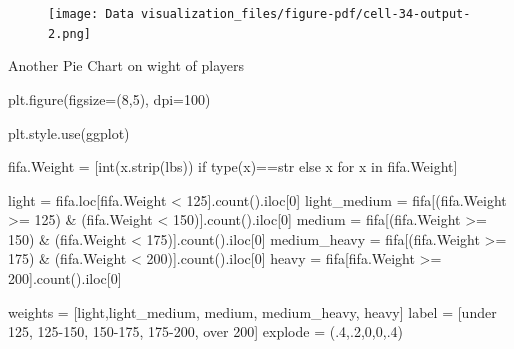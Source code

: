 \documentclass[
  letterpaper,
  DIV=11,
  numbers=noendperiod]{scrreprt}
\newenvironment{Shaded}{\begin{snugshade}}{\end{snugshade}}
\newcommand{\BuiltInTok}[1]{\textcolor[rgb]{0.00,0.23,0.31}{#1}}
\newcommand{\ControlFlowTok}[1]{\textcolor[rgb]{0.00,0.23,0.31}{#1}}
\newcommand{\DecValTok}[1]{\textcolor[rgb]{0.68,0.00,0.00}{#1}}
\newcommand{\FloatTok}[1]{\textcolor[rgb]{0.68,0.00,0.00}{#1}}
\newcommand{\KeywordTok}[1]{\textcolor[rgb]{0.00,0.23,0.31}{#1}}
\newcommand{\NormalTok}[1]{\textcolor[rgb]{0.00,0.23,0.31}{#1}}
\newcommand{\OperatorTok}[1]{\textcolor[rgb]{0.37,0.37,0.37}{#1}}
\newcommand{\StringTok}[1]{\textcolor[rgb]{0.13,0.47,0.30}{#1}}
\begin{document}
\begin{figure}[H]

{\centering \texttt{[image: Data visualization\_files/figure-pdf/cell-34-output-2.png]}

}

\end{figure}

Another Pie Chart on wight of players

\begin{Shaded}
\begin{Highlighting}[]
\NormalTok{plt.figure(figsize}\OperatorTok{=}\NormalTok{(}\DecValTok{8}\NormalTok{,}\DecValTok{5}\NormalTok{), dpi}\OperatorTok{=}\DecValTok{100}\NormalTok{)}

\NormalTok{plt.style.use(}\StringTok{\textquotesingle{}ggplot\textquotesingle{}}\NormalTok{)}

\NormalTok{fifa.Weight }\OperatorTok{=}\NormalTok{ [}\BuiltInTok{int}\NormalTok{(x.strip(}\StringTok{\textquotesingle{}lbs\textquotesingle{}}\NormalTok{)) }\ControlFlowTok{if} \BuiltInTok{type}\NormalTok{(x)}\OperatorTok{==}\BuiltInTok{str} \ControlFlowTok{else}\NormalTok{ x }\ControlFlowTok{for}\NormalTok{ x }\KeywordTok{in}\NormalTok{ fifa.Weight]}

\NormalTok{light }\OperatorTok{=}\NormalTok{ fifa.loc[fifa.Weight }\OperatorTok{\textless{}} \DecValTok{125}\NormalTok{].count().iloc[}\DecValTok{0}\NormalTok{]}
\NormalTok{light\_medium }\OperatorTok{=}\NormalTok{ fifa[(fifa.Weight }\OperatorTok{\textgreater{}=} \DecValTok{125}\NormalTok{) }\OperatorTok{\&}\NormalTok{ (fifa.Weight }\OperatorTok{\textless{}} \DecValTok{150}\NormalTok{)].count().iloc[}\DecValTok{0}\NormalTok{]}
\NormalTok{medium }\OperatorTok{=}\NormalTok{ fifa[(fifa.Weight }\OperatorTok{\textgreater{}=} \DecValTok{150}\NormalTok{) }\OperatorTok{\&}\NormalTok{ (fifa.Weight }\OperatorTok{\textless{}} \DecValTok{175}\NormalTok{)].count().iloc[}\DecValTok{0}\NormalTok{]}
\NormalTok{medium\_heavy }\OperatorTok{=}\NormalTok{ fifa[(fifa.Weight }\OperatorTok{\textgreater{}=} \DecValTok{175}\NormalTok{) }\OperatorTok{\&}\NormalTok{ (fifa.Weight }\OperatorTok{\textless{}} \DecValTok{200}\NormalTok{)].count().iloc[}\DecValTok{0}\NormalTok{]}
\NormalTok{heavy }\OperatorTok{=}\NormalTok{ fifa[fifa.Weight }\OperatorTok{\textgreater{}=} \DecValTok{200}\NormalTok{].count().iloc[}\DecValTok{0}\NormalTok{]}

\NormalTok{weights }\OperatorTok{=}\NormalTok{ [light,light\_medium, medium, medium\_heavy, heavy]}
\NormalTok{label }\OperatorTok{=}\NormalTok{ [}\StringTok{\textquotesingle{}under 125\textquotesingle{}}\NormalTok{, }\StringTok{\textquotesingle{}125{-}150\textquotesingle{}}\NormalTok{, }\StringTok{\textquotesingle{}150{-}175\textquotesingle{}}\NormalTok{, }\StringTok{\textquotesingle{}175{-}200\textquotesingle{}}\NormalTok{, }\StringTok{\textquotesingle{}over 200\textquotesingle{}}\NormalTok{]}
\NormalTok{explode }\OperatorTok{=}\NormalTok{ (}\FloatTok{.4}\NormalTok{,}\FloatTok{.2}\NormalTok{,}\DecValTok{0}\NormalTok{,}\DecValTok{0}\NormalTok{,}\FloatTok{.4}\NormalTok{)}


\end{Highlighting}
\end{Shaded}
\end{document}
